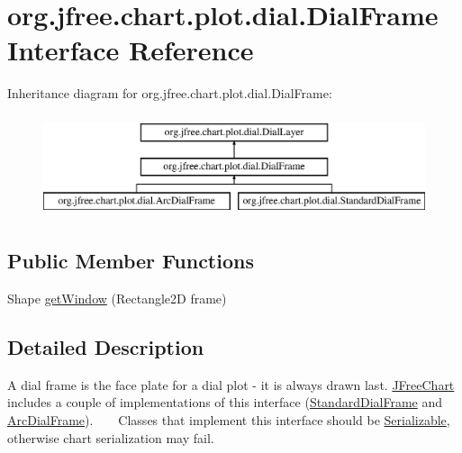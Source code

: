 \hypertarget{interfaceorg_1_1jfree_1_1chart_1_1plot_1_1dial_1_1_dial_frame}{}\section{org.\+jfree.\+chart.\+plot.\+dial.\+Dial\+Frame Interface Reference}
\label{interfaceorg_1_1jfree_1_1chart_1_1plot_1_1dial_1_1_dial_frame}
Inheritance diagram for org.\+jfree.\+chart.\+plot.\+dial.\+Dial\+Frame\+:\begin{figure}[H]
\begin{center}
\leavevmode
\includegraphics[height=3.000000cm]{interfaceorg_1_1jfree_1_1chart_1_1plot_1_1dial_1_1_dial_frame}
\end{center}
\end{figure}
\subsection*{Public Member Functions}
\begin{DoxyCompactItemize}
\item 
Shape \mbox{\hyperlink{interfaceorg_1_1jfree_1_1chart_1_1plot_1_1dial_1_1_dial_frame_ad7f7696c45b0af4fe283d16a0a630d60}{get\+Window}} (Rectangle2D frame)
\end{DoxyCompactItemize}


\subsection{Detailed Description}
A dial frame is the face plate for a dial plot -\/ it is always drawn last. \mbox{\hyperlink{classorg_1_1jfree_1_1chart_1_1_j_free_chart}{J\+Free\+Chart}} includes a couple of implementations of this interface (\mbox{\hyperlink{classorg_1_1jfree_1_1chart_1_1plot_1_1dial_1_1_standard_dial_frame}{Standard\+Dial\+Frame}} and \mbox{\hyperlink{classorg_1_1jfree_1_1chart_1_1plot_1_1dial_1_1_arc_dial_frame}{Arc\+Dial\+Frame}}). ~\newline
~\newline
 Classes that implement this interface should be \mbox{\hyperlink{}{Serializable}}, otherwise chart serialization may fail.

